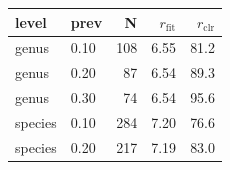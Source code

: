 \begin{tabular}{llrrr}
\toprule
level & prev & N & $r_{\mathrm{fit}}$ & $r_{\mathrm{clr}}$ \\
\midrule
genus & 0.10 & 108 & 6.55 & 81.2 \\
genus & 0.20 & 87 & 6.54 & 89.3 \\
genus & 0.30 & 74 & 6.54 & 95.6 \\
species & 0.10 & 284 & 7.20 & 76.6 \\
species & 0.20 & 217 & 7.19 & 83.0 \\
\bottomrule
\end{tabular}
